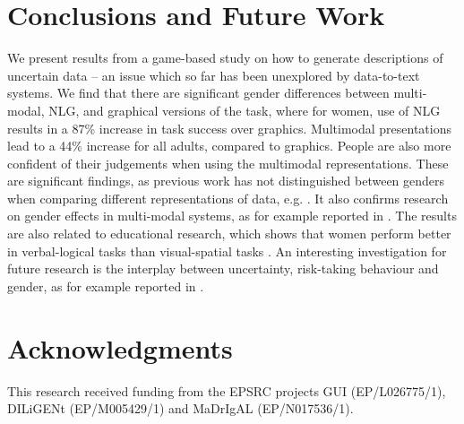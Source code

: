 \documentclass[11pt]{article}
\begin{document}



\section{Conclusions and Future Work} \label{conclusions}

We present results from a game-based study on how to generate descriptions of uncertain data -- an issue which so far has been unexplored by data-to-text systems.
We find that there are significant gender differences between multi-modal, NLG, and graphical  versions of the task, where for women, use of NLG results in a 87\% increase in task success over graphics. Multimodal presentations lead to a 44\% increase for all adults, compared to   graphics. People are also more confident of their judgements when using the multimodal representations.
%
These are significant findings, as previous work has not distinguished between genders when comparing different representations of data, e.g. \cite{Gatt2009}.
It also confirms %
research on gender effects in multi-modal systems, as for example reported in \cite{mef:eacl06,rieser:acl08,moller:2012}. %
The results are also related to educational research, which shows that women perform better in verbal-logical tasks than visual-spatial tasks \cite{Zhu2007}.
An interesting investigation for future research is the interplay between uncertainty, risk-taking behaviour and gender, as for example reported in \cite{Sarin20161}. 


\footnotesize
\section*{Acknowledgments}
\vspace{-0.2cm}
This research received funding from the EPSRC projects GUI (EP/L026775/1), DILiGENt (EP/M005429/1) and  MaDrIgAL (EP/N017536/1).
\normalsize



\end{document}
